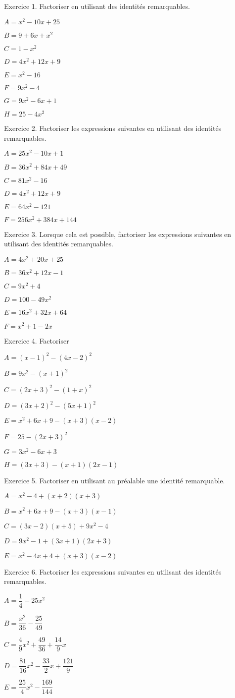 Exercice 1. 
Factoriser en utilisant des identités remarquables.

$A=x^2-10x+25$

$B=9+6x+x^2$

$C=1-x^2$

$D=4x^2+12x+9$

$E=x^2-16$

$F=9x^2-4$

$G=9x^2-6x+1$

$H=25-4x^2$

\vspace{1cm}
Exercice 2. Factoriser les expressions suivantes en utilisant des identités remarquables.

$A=25x^2-10x+1$

$B=36x^2+84x+49$

$C=81x^2-16$

$D=4x^2+12x+9$

$E=64x^2-121$

$F=256x^2+384x+144$

\vspace{1cm}
Exercice 3. Lorsque cela est possible, factoriser les expressions suivantes en utilisant des identités remarquables.

$A=4x^2+20x+25$

$B=36x^2+12x-1$

$C=9x^2+4$

$D=100-49x^2$

$E=16x^2+32x+64$

$F=x^2+1-2x$

\newpage
Exercice 4. Factoriser

$A=(x-1)^2-(4x-2)^2$

$B=9x^2-(x+1)^2$

$C=(2x+3)^2-(1+x)^2$

$D=(3x+2)^2-(5x+1)^2$

$E=x^2+6x+9-(x+3)(x-2)$

$F=25-(2x+3)^2$

$G=3x^2-6x+3$

$H=(3x+3)-(x+1)(2x-1)$

\vspace{1cm}
Exercice 5. Factoriser en utilisant au préalable une identité remarquable.

$A=x^2-4+(x+2)(x+3)$

$B=x^2+6x+9-(x+3)(x-1)$

$C=(3x-2)(x+5)+9x^2-4$

$D=9x^2-1+(3x+1)(2x+3)$

$E=x^2-4x+4+(x+3)(x-2)$

\vspace{1cm}
Exercice 6. Factoriser les expressions suivantes en utilisant des identités remarquables.

$A=\dfrac{1}{4}-25x^2$

$B=\dfrac{x^2}{36}-\dfrac{25}{49}$

$C=\dfrac{4}{9}x^2+\dfrac{49}{36}+\dfrac{14}{9}x$

$D=\dfrac{81}{16}x^2-\dfrac{33}{2}x+\dfrac{121}{9}$

$E=\dfrac{25}{4}x^2-\dfrac{169}{144}$


